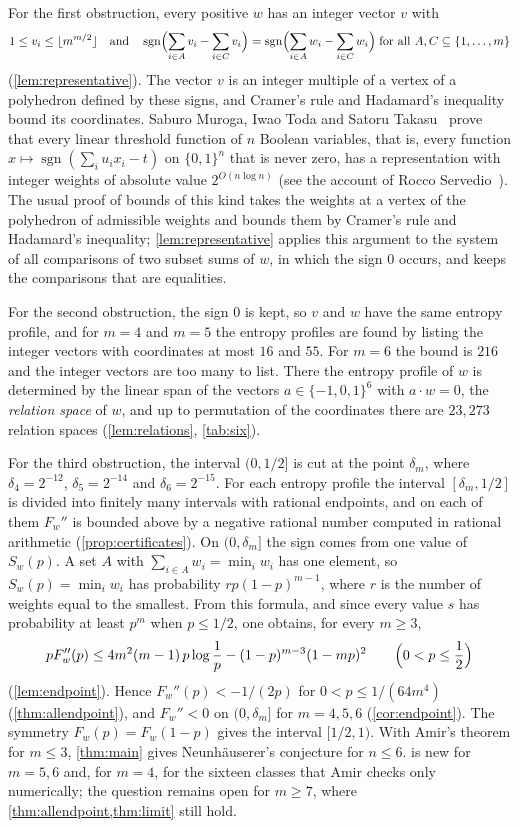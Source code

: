 \documentclass[11pt,a4paper]{article}
\numberwithin{equation}{section}
\theoremstyle{remark}
\newcommand{\sgn}{\operatorname{sgn}}
\begin{document}
For the first obstruction, every positive $w$ has an integer vector $v$ with
\[
 1\le v_i\le\lfloor m^{m/2}\rfloor
 \quad\text{and}\quad
 \sgn\Bigl(\sum_{i\in A}v_i-\sum_{i\in C}v_i\Bigr)
 =\sgn\Bigl(\sum_{i\in A}w_i-\sum_{i\in C}w_i\Bigr)
 \;\text{for all }A,C\subseteq\{1,\ldots,m\}
\]
(\cref{lem:representative}). The vector $v$ is an integer multiple of a vertex of a polyhedron defined by these signs, and Cramer's rule and Hadamard's inequality bound its coordinates. Saburo Muroga, Iwao Toda and Satoru Takasu~\cite{MTT} prove that every linear threshold function of $n$ Boolean variables, that is, every function $x\mapsto\sgn(\sum_iu_ix_i-t)$ on $\{0,1\}^n$ that is never zero, has a representation with integer weights of absolute value $2^{O(n\log n)}$ (see the account of Rocco Servedio~\cite{Servedio}). The usual proof of bounds of this kind takes the weights at a vertex of the polyhedron of admissible weights and bounds them by Cramer's rule and Hadamard's inequality; \cref{lem:representative} applies this argument to the system of all comparisons of two subset sums of $w$, in which the sign $0$ occurs, and keeps the comparisons that are equalities.

For the second obstruction, the sign $0$ is kept, so $v$ and $w$ have the same entropy profile, and for $m=4$ and $m=5$ the entropy profiles are found by listing the integer vectors with coordinates at most $16$ and $55$. For $m=6$ the bound is $216$ and the integer vectors are too many to list. There the entropy profile of $w$ is determined by the linear span of the vectors $a\in\{-1,0,1\}^6$ with $a\cdot w=0$, the \emph{relation space} of $w$, and up to permutation of the coordinates there are $23{,}273$ relation spaces (\cref{lem:relations}, \cref{tab:six}).

For the third obstruction, the interval $(0,1/2]$ is cut at the point $\delta_m$, where $\delta_4=2^{-12}$, $\delta_5=2^{-14}$ and $\delta_6=2^{-15}$. For each entropy profile the interval $[\delta_m,1/2]$ is divided into finitely many intervals with rational endpoints, and on each of them $F_w''$ is bounded above by a negative rational number computed in rational arithmetic (\cref{prop:certificates}). On $(0,\delta_m]$ the sign comes from one value of $S_w(p)$. A set $A$ with $\sum_{i\in A}w_i=\min_iw_i$ has one element, so $S_w(p)=\min_iw_i$ has probability $rp(1-p)^{m-1}$, where $r$ is the number of weights equal to the smallest. From this formula, and since every value $s$ has probability at least $p^m$ when $p\le1/2$, one obtains, for every $m\ge3$,
\[
 pF_w''(p)\le 4m^2(m-1)\,p\log\frac1p-(1-p)^{m-3}(1-mp)^2\qquad\Bigl(0<p\le\frac12\Bigr)
\]
(\cref{lem:endpoint}). Hence $F_w''(p)<-1/(2p)$ for $0<p\le1/(64m^4)$ (\cref{thm:allendpoint}), and $F_w''<0$ on $(0,\delta_m]$ for $m=4,5,6$ (\cref{cor:endpoint}). The symmetry $F_w(p)=F_w(1-p)$ gives the interval $[1/2,1)$. With Amir's theorem for $m\le3$, \cref{thm:main} gives Neunh\"auserer's conjecture for $n\le6$.  is new for $m=5,6$ and, for $m=4$, for the sixteen classes that Amir checks only numerically; the question remains open for $m\ge7$, where \cref{thm:allendpoint,thm:limit} still hold.
\end{document}

